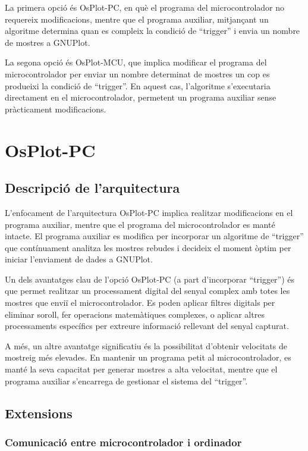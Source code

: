 \documentclass{tfgitic}[2023/06/30]
\begin{document}
La primera opció és OsPlot-PC, en què el programa del microcontrolador
no requereix modificacions, mentre que el programa auxiliar,
mitjançant un algoritme determina quan es compleix la condició de
``trigger'' i envia un nombre de mostres a GNUPlot.

La segona opció és OsPlot-MCU, que implica modificar el programa del
microcontrolador per enviar un nombre determinat de mostres un cop es
produeixi la condició de ``trigger''. En aquest cas, l'algoritme
s'executaria directament en el microcontrolador, permetent un programa
auxiliar sense pràcticament modificacions.

\newpage

\section{OsPlot-PC}

\subsection{Descripció de l'arquitectura}

L'enfocament de l'arquitectura OsPlot-PC implica realitzar
modificacions en el programa auxiliar, mentre que el programa del
microcontrolador es manté intacte. El programa auxiliar es modifica
per incorporar un algoritme de ``trigger'' que contínuament analitza
les mostres rebudes i decideix el moment òptim per iniciar l'enviament
de dades a GNUPlot.

Un dels avantatges clau de l'opció OsPlot-PC (a part d'incorporar
``trigger'') és que permet realitzar un processament digital del
senyal complex amb totes les mostres que enviï el microcontrolador. Es
poden aplicar filtres digitals per eliminar soroll, fer operacions
matemàtiques complexes, o aplicar altres processaments específics per
extreure informació rellevant del senyal capturat.

A més, un altre avantatge significatiu és la possibilitat d'obtenir
velocitats de mostreig més elevades. En mantenir un programa petit al
microcontrolador, es manté la seva capacitat per generar mostres a
alta velocitat, mentre que el programa auxiliar s'encarrega de
gestionar el sistema del ``trigger''.

\subsection{Extensions}
\label{subsec:extensions-osplot-pc}

\subsubsection{Comunicació entre microcontrolador i ordinador}
\end{document}
